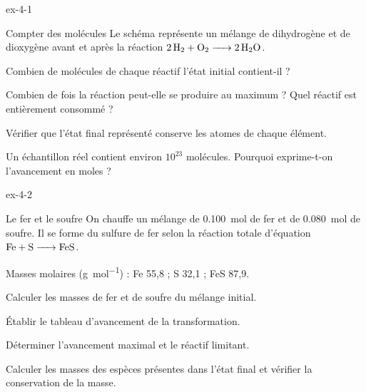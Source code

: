 \begin{blocLivre}{ex-4-1}
\begin{exercice}[1]{Compter des molécules}
Le schéma représente un mélange de dihydrogène et de dioxygène avant et après la réaction $\ce{2H2 + O2 -> 2H2O}$.
\begin{questions}
\item Combien de molécules de chaque réactif l'état initial contient-il ?
\item Combien de fois la réaction peut-elle se produire au maximum ? Quel réactif est entièrement consommé ?
\item Vérifier que l'état final représenté conserve les atomes de chaque élément.
\item Un échantillon réel contient environ $10^{23}$ molécules. Pourquoi exprime-t-on l'avancement en moles ?
\end{questions}
\end{exercice}
\end{blocLivre}
\begin{blocLivre}{ex-4-2}
\begin{exercice}[1]{Le fer et le soufre}
On chauffe un mélange de \qty{0,100}{mol} de fer et de \qty{0,080}{mol} de soufre. Il se forme du sulfure de fer selon la réaction
totale d'équation $\ce{Fe + S -> FeS}$.
\begin{donnees}
Masses molaires (\unit{g.mol^{-1}}) : Fe 55,8 ; S 32,1 ; FeS 87,9.
\end{donnees}
\begin{questions}
\item Calculer les masses de fer et de soufre du mélange initial.
\item Établir le tableau d'avancement de la transformation.
\item Déterminer l'avancement maximal et le réactif limitant.
\item Calculer les masses des espèces présentes dans l'état final et vérifier la conservation de la masse.
\end{questions}
\end{exercice}
\end{blocLivre}
